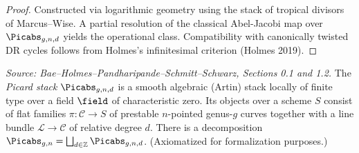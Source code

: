 \begin{proof}
  Constructed via logarithmic geometry using the stack of tropical divisors of Marcus--Wise.
  A partial resolution of the classical Abel-Jacobi map over $\Picabs_{g,n,d}$ yields the
  operational class.  Compatibility with canonically twisted DR cycles follows from
  Holmes's infinitesimal criterion (Holmes 2019).
\end{proof}

\begin{definition}
  \label{def:picard_stack}
  \textit{Source: Bae--Holmes--Pandharipande--Schmitt--Schwarz, Sections 0.1 and 1.2.}
  The \emph{Picard stack} $\Picabs_{g,n,d}$ is a smooth algebraic (Artin) stack locally of
  finite type over a field $\field$ of characteristic zero.  Its objects over a scheme $S$
  consist of flat families $\pi\colon \mathcal{C} \to S$ of prestable $n$-pointed genus-$g$
  curves together with a line bundle $\mathcal{L} \to \mathcal{C}$ of relative degree $d$.
  There is a decomposition
  $\Picabs_{g,n} = \bigsqcup_{d \in \mathbb{Z}} \Picabs_{g,n,d}$.
  (Axiomatized for formalization purposes.)
\end{definition}

